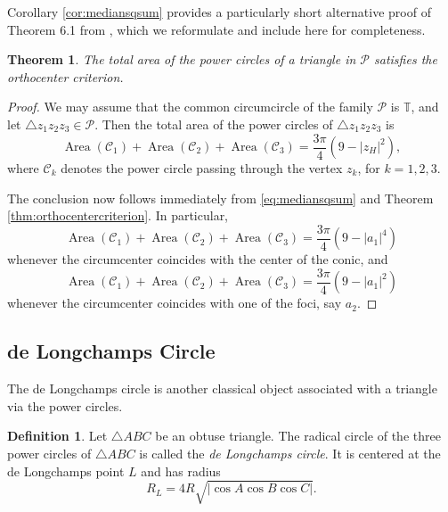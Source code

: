 \documentclass[11pt,reqno]{amsart}
\newtheorem{theorem}{Theorem}[section]
\theoremstyle{definition}
\newtheorem{definition}{Definition}[section]
\numberwithin{equation}{section}
\begin{document}
Corollary \ref{cor:mediansqsum} provides a particularly short alternative proof of Theorem 6.1 from \cite{Dragovic-Murad2026}, which we reformulate and include here for completeness.
\begin{theorem}
 The total area of the power circles of a triangle in $\mathcal P$ satisfies the orthocenter criterion.
\end{theorem}
\begin{proof} We may assume that the common circumcircle of the family $\mathcal P$ is $\mathbb T$, and let $\triangle z_1z_2z_3\in\mathcal P$. Then the total area of the power circles of $\triangle z_1z_2z_3$ is
\[
\operatorname{Area}(\mathcal C_1)
+\operatorname{Area}(\mathcal C_2)
+\operatorname{Area}(\mathcal C_3)
=
\frac{3\pi}{4}(9-|z_H|^2),
\]
where $\mathcal C_k$ denotes the power circle passing through the vertex $z_k$, for $k=1,2,3$.

The conclusion now follows immediately from \eqref{eq:mediansqsum} and Theorem \ref{thm:orthocentercriterion}. In particular,
\[
\operatorname{Area}(\mathcal C_1)
+\operatorname{Area}(\mathcal C_2)
+\operatorname{Area}(\mathcal C_3)
=
\frac{3\pi}{4}(9-|a_1|^4)
\]
whenever the circumcenter coincides with the center of the conic, and
\[
\operatorname{Area}(\mathcal C_1)
+\operatorname{Area}(\mathcal C_2)
+\operatorname{Area}(\mathcal C_3)
=
\frac{3\pi}{4}(9-|a_1|^2)
\]
whenever the circumcenter coincides with one of the foci, say $a_2$.
\end{proof}

\subsection{de Longchamps Circle}\label{sec:delongcirc}

The de Longchamps circle is another classical object associated with a triangle via the power circles.

\begin{definition}\label{def:deLongchampcirc}
Let $\triangle ABC$ be an obtuse triangle. The radical circle of the three power circles of $\triangle ABC$ is called the \emph{de Longchamps circle}. It is centered at the de Longchamps point $L$ and has radius
\[
R_L=4R\sqrt{|\cos A\cos B\cos C|}.
\]
\end{definition}
\end{document}
